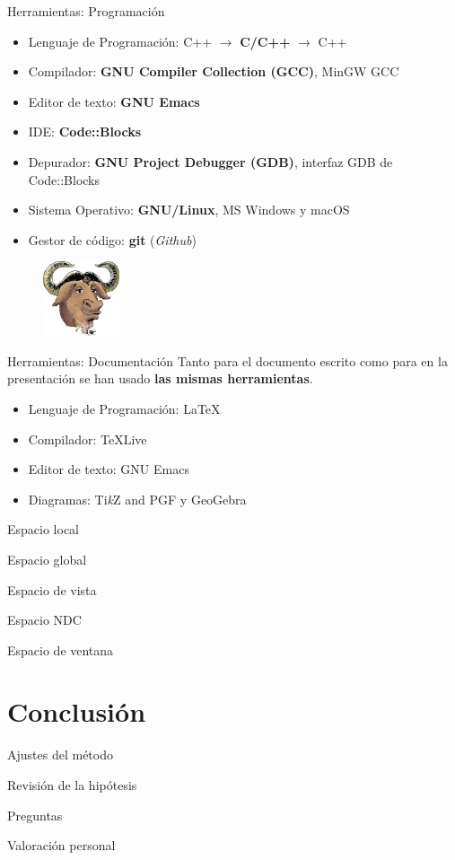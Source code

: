 \documentclass{beamer}
\begin{document}
\begin{frame}{Herramientas: Programación}
  \begin{itemize}
  \item{Lenguaje de Programación: C++ $\rightarrow$ \textbf{C/C++} $\rightarrow$ C++}
  \item{Compilador: \textbf{GNU Compiler Collection (GCC)}, MinGW GCC}
  \item{Editor de texto: \textbf{GNU Emacs}}
  \item{IDE: \textbf{Code::Blocks}}
  \item{Depurador: \textbf{GNU Project Debugger (GDB)}, interfaz GDB de Code::Blocks}
  \item{Sistema Operativo: \textbf{GNU/Linux}, MS Windows y macOS}
  \item{Gestor de código: \textbf{git} (\textit{Github})}
  \end{itemize}
  \begin{figure} [h]
    \centering
    \includegraphics[width=0.2\textwidth]{img/reiss-head}
  \end{figure}
\end{frame}

\begin{frame}{Herramientas: Documentación}
  Tanto para el documento escrito como para en la presentación se han usado \textbf{las mismas herramientas}.
  \begin{itemize}
  \item{Lenguaje de Programación: \textrm{\LaTeX}}
  \item{Compilador: \textrm{\TeX  Live}}
  \item{Editor de texto: GNU Emacs}
  \item{Diagramas: Ti\textit{k}Z and PGF y GeoGebra}
  \end{itemize}
\end{frame}

\begin{frame}{Espacio local}
\end{frame}
\begin{frame}{Espacio global}
\end{frame}
\begin{frame}{Espacio de vista}
\end{frame}
\begin{frame}{Espacio NDC}
\end{frame}
\begin{frame}{Espacio de ventana}
\end{frame}

\section{Conclusión}
\begin{frame}{Ajustes del método}
\end{frame}
\begin{frame}{Revisión de la hipótesis}
\end{frame}
\begin{frame}{Preguntas}
\end{frame}
\begin{frame}{Valoración personal}
\end{frame}
\end{document}

